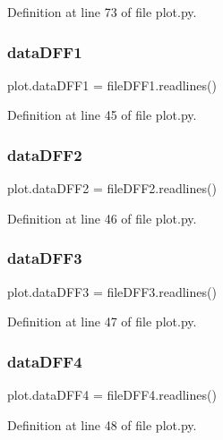 Definition at line 73 of file plot.\+py.

\mbox{\label{namespaceplot_a0b09fa8275575009cfcfd4efbb9141ff}} 
\subsubsection{data\+D\+F\+F1}
{\footnotesize\ttfamily plot.\+data\+D\+F\+F1 = file\+D\+F\+F1.\+readlines()}



Definition at line 45 of file plot.\+py.

\mbox{\label{namespaceplot_a288266ec5b75fcd0cb0863aa097ac0ba}} 
\subsubsection{data\+D\+F\+F2}
{\footnotesize\ttfamily plot.\+data\+D\+F\+F2 = file\+D\+F\+F2.\+readlines()}



Definition at line 46 of file plot.\+py.

\mbox{\label{namespaceplot_a245b32cf95a17eb9e3fba727f4847cd1}} 
\subsubsection{data\+D\+F\+F3}
{\footnotesize\ttfamily plot.\+data\+D\+F\+F3 = file\+D\+F\+F3.\+readlines()}



Definition at line 47 of file plot.\+py.

\mbox{\label{namespaceplot_ae8b1e6452e11df1f2c798c3a18b0bfbf}} 
\subsubsection{data\+D\+F\+F4}
{\footnotesize\ttfamily plot.\+data\+D\+F\+F4 = file\+D\+F\+F4.\+readlines()}



Definition at line 48 of file plot.\+py.

\mbox{\label{namespaceplot_a61621ee4d5a3b36384ab634c8ff80514}} 
